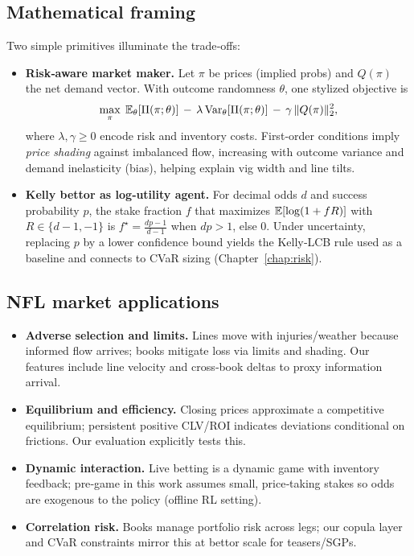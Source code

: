 \subsection{Mathematical framing}
Two simple primitives illuminate the trade‑offs:
\begin{itemize}
  \item \textbf{Risk‑aware market maker.} Let $\pi$ be prices (implied probs) and $Q(\pi)$ the net demand vector. With outcome randomness $\theta$, one stylized objective is
  \[
  \max_{\pi}\; \mathbb{E}_\theta[\Pi(\pi;\theta)]\,-\,\lambda\,\mathrm{Var}_\theta[\Pi(\pi;\theta)]\,-\,\gamma\,\|Q(\pi)\|_2^2,
  \]
  where $\lambda,\gamma\ge 0$ encode risk and inventory costs. First‑order conditions imply \emph{price shading} against imbalanced flow, increasing with outcome variance and demand inelasticity (bias), helping explain vig width and line tilts.
  \item \textbf{Kelly bettor as log‑utility agent.} For decimal odds $d$ and success probability $p$, the stake fraction $f$ that maximizes $\mathbb{E}[\log(1+fR)]$ with $R\in\{d-1,-1\}$ is $f^\star=\tfrac{dp-1}{d-1}$ when $dp>1$, else $0$. Under uncertainty, replacing $p$ by a lower confidence bound yields the Kelly‑LCB rule used as a baseline and connects to CVaR sizing (Chapter~\ref{chap:risk}).
\end{itemize}

\subsection{NFL market applications}
\begin{itemize}
  \item \textbf{Adverse selection and limits.} Lines move with injuries/weather because informed flow arrives; books mitigate loss via limits and shading. Our features include line velocity and cross‑book deltas to proxy information arrival.
  \item \textbf{Equilibrium and efficiency.} Closing prices approximate a competitive equilibrium; persistent positive CLV/ROI indicates deviations conditional on frictions. Our evaluation explicitly tests this.
  \item \textbf{Dynamic interaction.} Live betting is a dynamic game with inventory feedback; pre‑game in this work assumes small, price‑taking stakes so odds are exogenous to the policy (offline RL setting).
  \item \textbf{Correlation risk.} Books manage portfolio risk across legs; our copula layer and CVaR constraints mirror this at bettor scale for teasers/SGPs.
\end{itemize}

